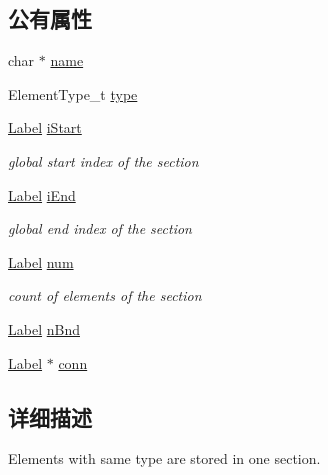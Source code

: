 \subsection*{公有属性}
\begin{DoxyCompactItemize}
\item 
char $\ast$ \hyperlink{classHSF_1_1Section_a697a4c5a9aa63a9988a0e15d28ad29bd}{name}
\item 
ElementType\_\-t \hyperlink{classHSF_1_1Section_a7f1a7eba24b2553f6e0e3919dbf05179}{type}
\item 
\hyperlink{namespaceHSF_ae65d72be782e989396ebe5ec6ae4c2b6}{Label} \hyperlink{classHSF_1_1Section_a66f4b950c76813c20b8dc8c0cc6626a2}{iStart}
\begin{DoxyCompactList}\small\item\em global start index of the section \item\end{DoxyCompactList}\item 
\hyperlink{namespaceHSF_ae65d72be782e989396ebe5ec6ae4c2b6}{Label} \hyperlink{classHSF_1_1Section_aa55c4d1b564b144f7d35057210282c44}{iEnd}
\begin{DoxyCompactList}\small\item\em global end index of the section \item\end{DoxyCompactList}\item 
\hyperlink{namespaceHSF_ae65d72be782e989396ebe5ec6ae4c2b6}{Label} \hyperlink{classHSF_1_1Section_abbaa8c9618797848a5bae1e9e41287c9}{num}
\begin{DoxyCompactList}\small\item\em count of elements of the section \item\end{DoxyCompactList}\item 
\hyperlink{namespaceHSF_ae65d72be782e989396ebe5ec6ae4c2b6}{Label} \hyperlink{classHSF_1_1Section_aec6498be47ad3f899d20ad3a814f1a2c}{nBnd}
\item 
\hyperlink{namespaceHSF_ae65d72be782e989396ebe5ec6ae4c2b6}{Label} $\ast$ \hyperlink{classHSF_1_1Section_a21e40283b7ab3f9a90264724747b18b1}{conn}
\end{DoxyCompactItemize}


\subsection{详细描述}
Elements with same type are stored in one section. 

